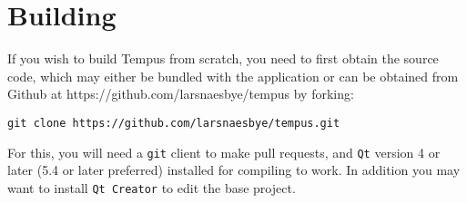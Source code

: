\section{Building}

If you wish to build Tempus from scratch, you need to first obtain the source code, which may either be bundled with the application or can be obtained from Github at https://github.com/larsnaesbye/tempus by forking:

\texttt{git clone https://github.com/larsnaesbye/tempus.git}

For this, you will need a \texttt{git} client to make pull requests, and \texttt{Qt} version 4 or later (5.4 or later preferred) installed for compiling to work. In addition you may want to install \texttt{Qt Creator} to edit the base project.

